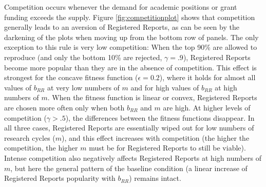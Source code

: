 \documentclass[
  ,man,mask,floatsintext]{apa6}
\begin{document}
Competition occurs whenever the demand for academic positions or grant funding exceeds the supply.
Figure \ref{fig:competitionplot} shows that competition generally leads to an aversion of Registered Reports, as can be seen by the darkening of the plots when moving up from the bottom row of panels.
The only exception to this rule is very low competition:
When the top 90\% are allowed to reproduce (and only the bottom 10\% are rejected, \(\gamma = .9\)), Registered Reports become more popular than they are in the absence of competition.
This effect is strongest for the concave fitness function (\(\epsilon = 0.2\)), where it holds for almost all values of \(b_{RR}\) at very low numbers of \(m\) and for high values of \(b_{RR}\) at high numbers of \(m\).
When the fitness function is linear or convex, Registered Reports are chosen more often only when both \(b_{RR}\) and \(m\) are high.
At higher levels of competition (\(\gamma > .5\)), the differences between the fitness functions disappear.
In all three cases, Registered Reports are essentially wiped out for low numbers of research cycles (\(m\)), and this effect increases with competition (the higher the competition, the higher \(m\) must be for Registered Reports to still be viable).
Intense competition also negatively affects Registered Reports at high numbers of \(m\), but here the general pattern of the baseline condition (a linear increase of Registered Reports popularity with \(b_{RR}\)) remains intact.
\end{document}
